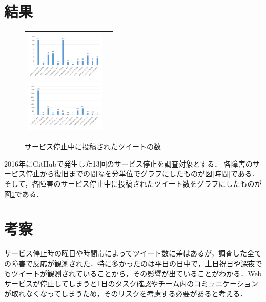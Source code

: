 \documentclass[uplatex,twocolumn,dvipdfmx]{jsarticle}
\begin{document}
\section{結果}
\vspace{-1.5zh}
\begin{figure}[htbp]
 \begin{tabular}{cc}
  \begin{minipage}{0.5\hsize}
    \begin{center}
      \includegraphics[width=38mm,clip]{graph1.pdf}
      \caption{サービス停止から復旧までの間隔}
      \label{時間}
  \end{center}
  \end{minipage}
  \begin{minipage}{0.5\hsize}
    \begin{center}
      \includegraphics[width=38mm,clip]{graph2.pdf}
      \caption{サービス停止中に投稿されたツイートの数}
      \label{ツイート数}
   \end{center} 
  \end{minipage}
 \end{tabular}
\end{figure}
\vspace{-1.5zh}
2016年にGitHubで発生した13回のサービス停止を調査対象とする．
各障害のサービス停止から復旧までの間隔を分単位でグラフにしたものが図\ref{時間}である．そして，各障害のサービス停止中に投稿されたツイート数をグラフにしたものが図\ref{ツイート数}である．


\section{考察}
サービス停止時の曜日や時間帯によってツイート数に差はあるが，調査した全ての障害で反応が観測された．特に多かったのは平日の日中で，土日祝日や深夜でもツイートが観測されていることから，その影響が出ていることがわかる．Webサービスが停止してしまうと1日のタスク確認やチーム内のコミュニケーションが取れなくなってしまうため，そのリスクを考慮する必要があると考える．
\end{document}
